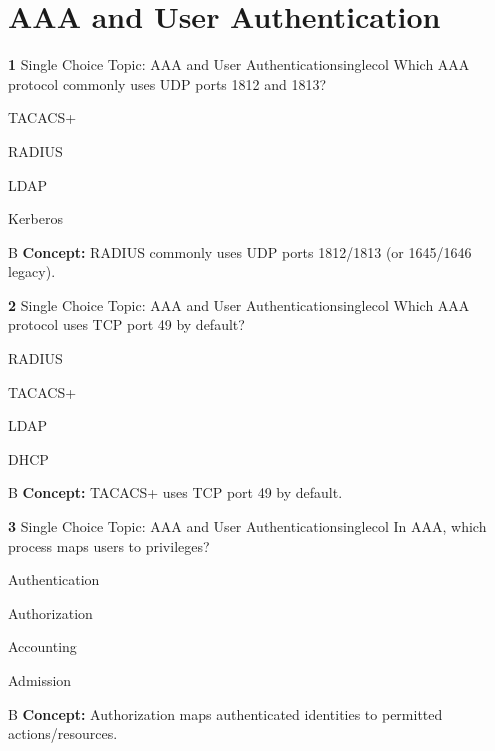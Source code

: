 \documentclass[10pt,a4paper]{article}
\begin{document}
\section{AAA and User Authentication}
\begin{qcard}{\color{white}\textbf{1} \hfill \small Single Choice \textbar{} Topic: AAA and User Authentication}{singlecol}
Which AAA protocol commonly uses UDP ports 1812 and 1813?

\begin{qoptions}
\item TACACS+
\item RADIUS
\item LDAP
\item Kerberos
\end{qoptions}
\begin{explainbox}{B}
\textbf{Concept:} RADIUS commonly uses UDP ports 1812/1813 (or 1645/1646 legacy).
\end{explainbox}
\end{qcard}

\begin{qcard}{\color{white}\textbf{2} \hfill \small Single Choice \textbar{} Topic: AAA and User Authentication}{singlecol}
Which AAA protocol uses TCP port 49 by default?

\begin{qoptions}
\item RADIUS
\item TACACS+
\item LDAP
\item DHCP
\end{qoptions}
\begin{explainbox}{B}
\textbf{Concept:} TACACS+ uses TCP port 49 by default.
\end{explainbox}
\end{qcard}

\begin{qcard}{\color{white}\textbf{3} \hfill \small Single Choice \textbar{} Topic: AAA and User Authentication}{singlecol}
In AAA, which process maps users to privileges?

\begin{qoptions}
\item Authentication
\item Authorization
\item Accounting
\item Admission
\end{qoptions}
\begin{explainbox}{B}
\textbf{Concept:} Authorization maps authenticated identities to permitted actions/resources.
\end{explainbox}
\end{qcard}
\end{document}
